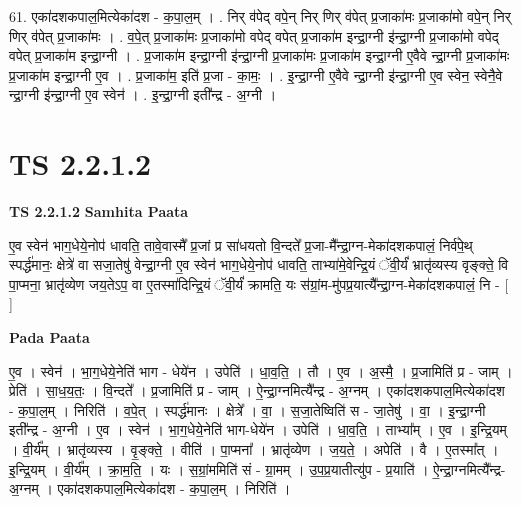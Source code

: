 \documentclass[17pt]{extarticle}
\begin{document}
61. एका॑दशकपाल॒मित्येका॑दश - क॒पा॒ल॒म् । . निर् व॑पेद् वपे॒न् निर् णिर् व॑पेत् प्र॒जाका॑मः प्र॒जाका॑मो वपे॒न् निर् णिर् व॑पेत् प्र॒जाका॑मः । . व॒पे॒त् प्र॒जाका॑मः प्र॒जाका॑मो वपेद् वपेत् प्र॒जाका॑म इन्द्रा॒ग्नी इ॑न्द्रा॒ग्नी प्र॒जाका॑मो वपेद् वपेत् प्र॒जाका॑म इन्द्रा॒ग्नी । . प्र॒जाका॑म इन्द्रा॒ग्नी इ॑न्द्रा॒ग्नी प्र॒जाका॑मः प्र॒जाका॑म इन्द्रा॒ग्नी ए॒वैवे न्द्रा॒ग्नी प्र॒जाका॑मः प्र॒जाका॑म इन्द्रा॒ग्नी ए॒व । . प्र॒जाका॑म॒ इति॑ प्र॒जा - का॒मः॒ । . इ॒न्द्रा॒ग्नी ए॒वैवे न्द्रा॒ग्नी इ॑न्द्रा॒ग्नी ए॒व स्वेन॒ स्वेनै॒वे न्द्रा॒ग्नी इ॑न्द्रा॒ग्नी ए॒व स्वेन॑ । . इ॒न्द्रा॒ग्नी इती᳚न्द्र - अ॒ग्नी । \newline
\pagebreak
{}
\section*{ TS 2.2.1.2 }

\textbf{TS 2.2.1.2 } \newline
\textbf{Samhita Paata} \newline

ए॒व स्वेन॑ भाग॒धेये॒नोप॑ धावति॒ तावे॒वास्मै᳚ प्र॒जां प्र सा॑धयतो वि॒न्दते᳚ प्र॒जा-मै᳚न्द्रा॒ग्न-मेका॑दशकपालं॒ निर्व॑पे॒थ् स्पर्द्ध॑मानः॒ क्षेत्रे॑ वा सजा॒तेषु॑ वेन्द्रा॒ग्नी ए॒व स्वेन॑ भाग॒धेये॒नोप॑ धावति॒ ताभ्या॑मे॒वेन्द्रि॒यं ॅवी॒र्यं॑ भ्रातृ॑व्यस्य वृङ्क्ते॒ वि पा॒प्मना॒ भ्रातृ॑व्येण जय॒तेऽप॒ वा ए॒तस्मा॑दिन्द्रि॒यं ॅवी॒र्यं॑ क्रामति॒ यः स॑ग्रां॒म-मु॑पप्र॒यात्यै᳚न्द्रा॒ग्न-मेका॑दशकपालं॒ नि - [  ] \newline

\textbf{Pada Paata} \newline

ए॒व । स्वेन॑ । भा॒ग॒धेये॒नेति॑ भाग - धेये॑न । उपेति॑ । धा॒व॒ति॒ । तौ । ए॒व । अ॒स्मै॒ । प्र॒जामिति॑ प्र - जाम् । प्रेति॑ । सा॒ध॒य॒तः॒ । वि॒न्दते᳚ । प्र॒जामिति॑ प्र - जाम् । ऐ॒न्द्रा॒ग्नमित्यै᳚न्द्र - अ॒ग्नम् । एका॑दशकपाल॒मित्येका॑दश - क॒पा॒ल॒म् । निरिति॑ । व॒पे॒त् । स्पर्द्ध॑मानः । क्षेत्रे᳚ । वा॒ । स॒जा॒तेष्विति॑ स - जा॒तेषु॑ । वा॒ । इ॒न्द्रा॒ग्नी इती᳚न्द्र - अ॒ग्नी । ए॒व । स्वेन॑ । भा॒ग॒धेये॒नेति॑ भाग-धेये॑न । उपेति॑ । धा॒व॒ति॒ । ताभ्या᳚म् । ए॒व । इ॒न्द्रि॒यम् । वी॒र्य᳚म् । भ्रातृ॑व्यस्य । वृ॒ङ्क्ते॒ । वीति॑ । पा॒प्मना᳚ । भ्रातृ॑व्येण । ज॒य॒ते॒ । अपेति॑ । वै । ए॒तस्मा᳚त् । इ॒न्द्रि॒यम् । वी॒र्य᳚म् । क्रा॒म॒ति॒ । यः । स॒ग्रां॒ममिति॑ सं - ग्रा॒मम् । उ॒प॒प्र॒यातीत्यु॑प - प्र॒याति॑ । ऐ॒न्द्रा॒ग्नमित्यै᳚न्द्र-अ॒ग्नम् । एका॑दशकपाल॒मित्येका॑दश - क॒पा॒ल॒म् । निरिति॑ ।  \newline
\end{document}
